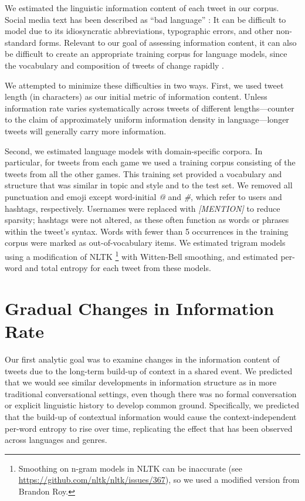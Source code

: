 \documentclass[11pt,letterpaper]{article}
\begin{document}
We estimated the linguistic information content of each tweet in our corpus. Social media text has been described as ``bad language'' \cite{eisenstein2013}: It can be difficult to model due to its idiosyncratic abbreviations, typographic errors, and other non-standard forms. Relevant to our goal of assessing information content, it can also be difficult to create an appropriate training corpus for language models, since the vocabulary and composition of tweets of change rapidly \cite{eisenstein2013}.

We attempted to minimize these difficulties in two ways.  First, we used tweet length (in characters) as our initial metric of information content. Unless information rate varies systematically across tweets of different lengths---counter to the claim of approximately uniform information density in language\cite{genzel2002,levy2007}---longer tweets will generally carry more information.

Second, we estimated language models with domain-specific corpora. In particular, for tweets from each game we used a training corpus consisting of the tweets from all the other games. This training set provided a vocabulary and structure that was similar in topic and style and to the test set.  We removed all punctuation and emoji except word-initial {\it @} and {\it \#}, which refer to users and hashtags, respectively.  Usernames were replaced with {\it [MENTION]} to reduce sparsity; hashtags were not altered, as these often function as words or phrases within the tweet's syntax.  Words with fewer than 5 occurrences in the training corpus were marked as out-of-vocabulary items. We estimated trigram models using a modification of NLTK \cite{bird2006}\footnote{Smoothing on n-gram models in NLTK can be inaccurate (see \url{https://github.com/nltk/nltk/issues/367}), so we used a modified version from Brandon Roy.} with Witten-Bell smoothing, and estimated per-word and total entropy for each tweet from these models.


\section{Gradual Changes in Information Rate}

Our first analytic goal was to examine changes in the information content of tweets due to the long-term build-up of context in a shared event.  We predicted that we would see similar developments in information structure as in more traditional conversational settings, even though there was no formal conversation or explicit linguistic history to develop common ground.  Specifically, we predicted that the build-up of contextual information would cause the context-independent per-word entropy to rise over time, replicating the effect that has been observed across languages and genres\cite{genzel2002,genzel2003,qian2012}.
\end{document}
